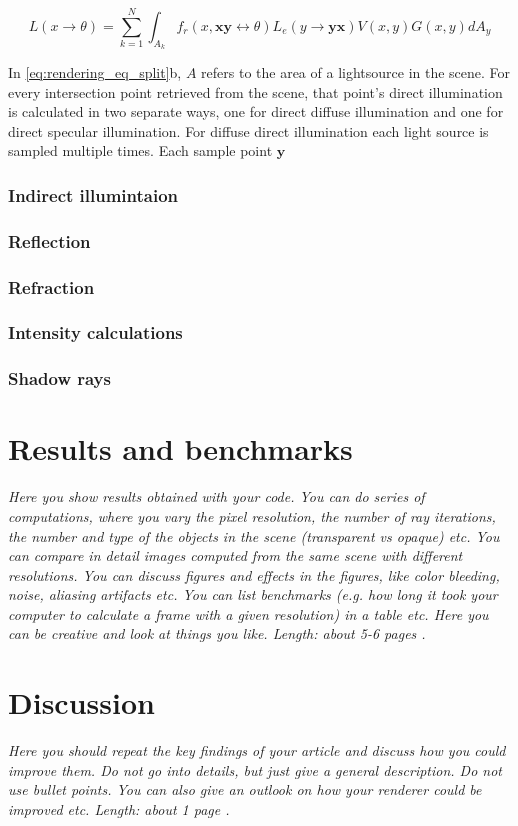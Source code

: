 \documentclass[]{report}   %
\begin{document}
\begin{equation}
\label{eq:disc_direct}
L(x \rightarrow \theta) = \sum^{N}_{k=1} \int_{A_k} f_r(x, \mathbf{xy}\leftrightarrow \theta) L_e(y \rightarrow \mathbf{yx})V(x,y)G(x,y)dA_y
\end{equation}

In \autoref{eq:rendering_eq_split}b, $A$ refers to the area of a lightsource in the scene.
For every intersection point retrieved from the scene, that point's direct illumination is calculated in two separate ways, one for direct diffuse illumination and one for direct specular illumination. For diffuse direct illumination each light source is sampled multiple times. Each sample point $\mathbf{y}$

\subsection{Indirect illumintaion}
\subsection{Reflection}
\subsection{Refraction}
\subsection{Intensity calculations}
\subsection{Shadow rays}

\chapter{Results and benchmarks}
\emph{Here you show results obtained with your code. You can do series of computations, where you vary the pixel resolution, the number of ray iterations, the number and type of the objects in the scene (transparent vs opaque) etc. You can compare in detail images computed from the same scene with different resolutions. You can discuss figures and effects in the figures, like color bleeding, noise, aliasing artifacts etc. You can list benchmarks (e.g. how long it took your computer to calculate a frame with a given resolution) in a table etc. Here you can be creative and look at things you like. 
Length: about 5-6 pages .}


\chapter{Discussion}
\emph{Here you should repeat the key findings of your article and discuss how you could improve them. 
Do not go into details, but just give a general description. 
Do not use bullet points. 
You can also give an outlook on how your renderer could be improved etc. 
Length: about 1 page .}



\end{document}
